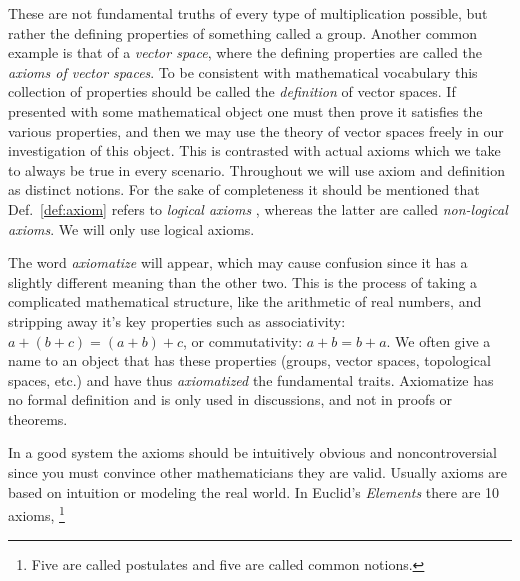         \par\vspace{2.5ex}
        These are not fundamental truths of every type of multiplication
        possible, but rather the defining properties of something called a
        group. Another common example is that of a \textit{vector space}, where
        the defining properties are called the \textit{axioms of vector spaces}.
        To be consistent with mathematical vocabulary this collection of
        properties should be called the \textit{definition} of vector spaces. If
        presented with some mathematical object one must then prove it
        satisfies the various properties, and then we may use the theory of
        vector spaces freely in our investigation of this object. This is
        contrasted with actual axioms which we take to always be true in every
        scenario. Throughout we will use axiom and definition as distinct
        notions. For the sake of completeness it should be mentioned that
        Def.~\ref{def:axiom} refers to \textit{logical axioms}%
        , whereas the latter are called
        \textit{non-logical axioms}. We will only
        use logical axioms.
        \par\hfill\par
        The word \textit{axiomatize} will appear, which
        may cause confusion since it has a slightly different meaning than the
        other two. This is the process of taking a complicated mathematical
        structure, like the arithmetic of real numbers, and stripping away it's
        key properties such as associativity: $a+(b+c)=(a+b)+c$, or
        commutativity: $a+b=b+a$. We often give a name to an object that has
        these properties (groups, vector spaces, topological spaces, etc.) and
        have thus \textit{axiomatized} the fundamental traits. Axiomatize has no
        formal definition and is only used in discussions, and not in proofs or
        theorems.
        \par\hfill\par
        In a good system the axioms should be intuitively obvious and
        noncontroversial since you must convince other mathematicians they are
        valid. Usually axioms are based on intuition or modeling the real world.
        In Euclid's \textit{Elements} there are 10
        axioms,%
        \footnote{%
            Five are called postulates and five are called common notions.%
        }
